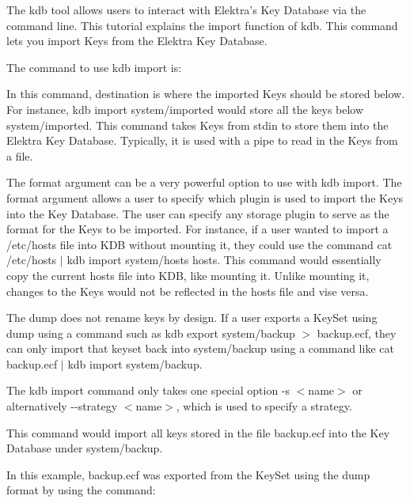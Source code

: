 The kdb tool allows users to interact with Elektra’s Key Database via the command line. This tutorial explains the import function of kdb. This command lets you import Keys from the Elektra Key Database.

The command to use kdb import is\+:


\begin{DoxyCode}{0}
\end{DoxyCode}


In this command, {\ttfamily destination} is where the imported Keys should be stored below. For instance, {\ttfamily kdb import system/imported} would store all the keys below {\ttfamily system/imported}. This command takes Keys from {\ttfamily stdin} to store them into the Elektra Key Database. Typically, it is used with a pipe to read in the Keys from a file.

The format argument can be a very powerful option to use with kdb import. The format argument allows a user to specify which plugin is used to import the Keys into the Key Database. The user can specify any storage plugin to serve as the format for the Keys to be imported. For instance, if a user wanted to import a {\ttfamily /etc/hosts} file into K\+DB without mounting it, they could use the command {\ttfamily cat /etc/hosts $\vert$ kdb import system/hosts hosts}. This command would essentially copy the current hosts file into K\+DB, like mounting it. Unlike mounting it, changes to the Keys would not be reflected in the hosts file and vise versa.

The dump does not rename keys by design. If a user exports a Key\+Set using dump using a command such as {\ttfamily kdb export system/backup $>$ backup.\+ecf}, they can only import that keyset back into {\ttfamily system/backup} using a command like {\ttfamily cat backup.\+ecf $\vert$ kdb import system/backup}.

The kdb import command only takes one special option {\ttfamily -\/s $<$name$>$} or alternatively {\ttfamily -\/-\/strategy $<$name$>$}, which is used to specify a strategy.


\begin{DoxyCode}{0}
\end{DoxyCode}


This command would import all keys stored in the file {\ttfamily backup.\+ecf} into the Key Database under {\ttfamily system/backup}.

In this example, {\ttfamily backup.\+ecf} was exported from the Key\+Set using the dump format by using the command\+:


